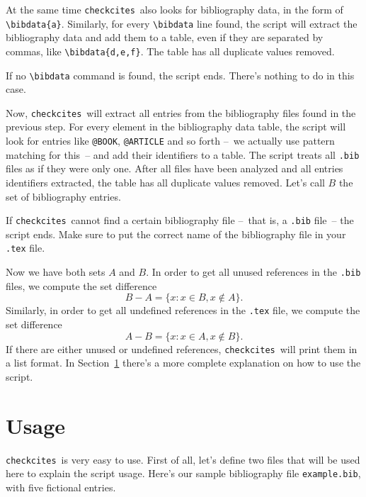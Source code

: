 \documentclass[12pt,a4paper]{article}
\newcommand{\checkcites}{\texttt{checkcites}}
\newenvironment{infoblock}[1]
  {\par\addvspace{\medskipamount}
   \begin{tcolorbox}[colframe=DarkTurquoise,coltitle=black,fonttitle=\bfseries,title=#1]}
  {\end{tcolorbox}\addvspace{\medskipamount}}
\begin{document}
At the same time \checkcites\ also looks for bibliography data, in the
form of \verb|\bibdata{a}|. Similarly, for every \verb|\bibdata| line
found, the script will extract the bibliography data and add them to a
table, even if they are separated by commas, like
\verb|\bibdata{d,e,f}|. The table has all duplicate values removed.

\begin{infoblock}{Attention!}
If no \verb|\bibdata| command is found, the script ends. There's
nothing to do in this case.
\end{infoblock}

Now, \checkcites\ will extract all entries from the bibliography files
found in the previous step. For every element in the bibliography data
table, the script will look for entries like \verb|@BOOK|,
\verb|@ARTICLE| and so forth --~we actually use pattern matching for
this~-- and add their identifiers to a table. The script treats all
\verb|.bib| files as if they were only one. After all files have been
analyzed and all entries identifiers extracted, the table has all
duplicate values removed. Let's call $B$ the set of bibliography
entries.

\begin{infoblock}{Attention!}
If \checkcites\ cannot find a certain bibliography file --~that is, a
\verb|.bib| file~-- the script ends. Make sure to put the correct
name of the bibliography file in your \verb|.tex| file.
\end{infoblock}

Now we have both sets $A$ and $B$. In order to get all unused
references in the \verb|.bib| files, we compute the set difference
\[
B - A = \{ x : x \in B, x \notin A \}.
\] 
Similarly, in order to get all undefined references in the \verb|.tex|
file, we compute the set difference
\[
A - B = \{ x : x \in A, x \notin B \}.
\]
If there are either unused or undefined references, \checkcites\ will
print them in a list format. In Section~\ref{sec:usage} there's a more
complete explanation on how to use the script.

\section{Usage}
\label{sec:usage}

\checkcites\ is very easy to use. First of all, let's define two files
that will be used here to explain the script usage. Here's our sample
bibliography file \verb|example.bib|, with five fictional entries.
\end{document}
